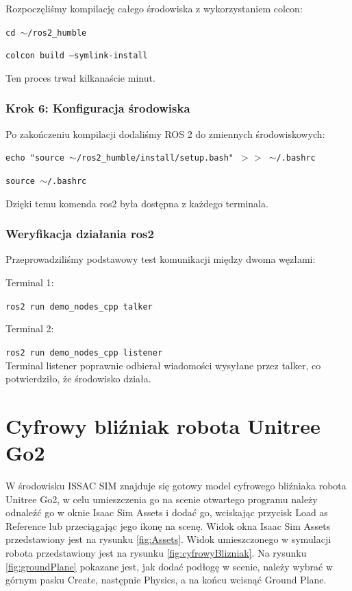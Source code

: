 \documentclass[12pt]{article}
\begin{document}
Rozpoczęliśmy kompilację całego środowiska z wykorzystaniem colcon:

\texttt{cd $\sim$/ros2\_humble}

\texttt{colcon build --symlink-install}

Ten proces trwał kilkanaście minut.


\subsubsection{Krok 6: Konfiguracja środowiska}

Po zakończeniu kompilacji dodaliśmy ROS 2 do zmiennych środowiskowych:

\texttt{echo "source $\sim$/ros2\_humble/install/setup.bash" $>>$ $\sim$/.bashrc}

\texttt{source $\sim$/.bashrc}

Dzięki temu komenda ros2 była dostępna z każdego terminala.

\subsubsection{Weryfikacja działania ros2 }

Przeprowadziliśmy podstawowy test komunikacji między dwoma węzłami:

Terminal 1:

\texttt{ros2 run demo\_nodes\_cpp talker}


Terminal 2:

\texttt{ros2 run demo\_nodes\_cpp listener}
\\
Terminal listener poprawnie odbierał wiadomości wysyłane przez talker, co potwierdziło, że środowisko działa.

\newpage
\section{Cyfrowy bliźniak robota Unitree Go2}

W środowisku ISSAC SIM znajduje się gotowy model cyfrowego bliźniaka robota Unitree Go2, w celu umieszczenia go na scenie otwartego programu należy odnaleźć go w oknie Isaac Sim Assets i dodać go, wciskając przycisk Load as Reference lub przeciągając jego ikonę na scenę. Widok okna Isaac Sim Assets przedstawiony jest na rysunku \ref{fig:Assets}. Widok umieszczonego w symulacji robota przedstawiony jest na rysunku \ref{fig:cyfrowyBlizniak}. Na rysunku \ref{fig:groundPlane} pokazane jest, jak dodać podłogę w scenie, należy wybrać w górnym pasku Create, następnie Physics,  a na końcu wcisnąć Ground Plane.  
\end{document}
